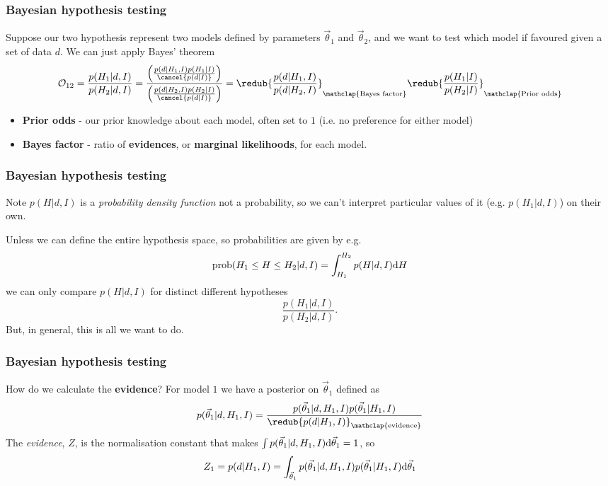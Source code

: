 \begin{frame}

\frametitle{Bayesian hypothesis testing}
\label{bayesianhypothesistesting}

Suppose our two hypothesis represent two models defined by parameters $\vec{\theta}_1$ and
$\vec{\theta}_2$, and we want to test which model if favoured given a set of data $d$. We can
just apply Bayes' theorem
\[
\mathcal{O}_{12} = \frac{p(H_1|d,I)}{p(H_2|d,I)} = \frac{\left( \frac{p(d|H_1,I)p(H_1|I)}{\cancel{p(d|I)}} \right)}
{\left( \frac{p(d|H_2,I)p(H_2|I)}{\cancel{p(d|I)}} \right)} = \redub{\frac{p(d|H_1,I)}{p(d|H_2,I)}}_{\mathclap{\text{Bayes factor}}} \redub{\frac{p(H_1|I)}{p(H_2|I)}}_{\mathclap{\text{Prior odds}}}
\]

\begin{itemize}
\item \textbf{Prior odds} - our prior knowledge about each model, often set to $1$ (i.e. no preference for either model)

\item \textbf{Bayes factor} - ratio of \textbf{evidences}, or \textbf{marginal likelihoods}, for each model.

\end{itemize}

\end{frame}

\begin{frame}

\frametitle{Bayesian hypothesis testing}
\label{bayesianhypothesistesting}

Note $p(H|d,I)$ is a \emph{probability density function} not a probability, so we can't interpret particular values
of it (e.g. $p(H_1|d,I)$) on their own.

Unless we can define the entire hypothesis space, so probabilities are given by e.g.
\[
\text{prob}(H_1 \le H \le H_2|d,I) = \int_{H_1}^{H_2} p(H|d,I) {\rm d}H
\]
we can only compare $p(H|d,I)$ for distinct different hypotheses
\[
\frac{p(H_1|d,I)}{p(H_2|d,I)}.
\]
But, in general, this is all we want to do.

\end{frame}

\begin{frame}

\frametitle{Bayesian hypothesis testing}
\label{bayesianhypothesistesting}

How do we calculate the \textbf{evidence}? For model $1$ we have a posterior on $\vec{\theta}_1$ defined as
\[
p(\vec{\theta}_1|d,H_1,I) = \frac{p(\vec{\theta}_1|d,H_1,I)p(\vec{\theta}_1|H_1,I)}{\redub{p(d|H_1,I)}_{\mathclap{\text{evidence}}}}
\]
The \emph{evidence}, $Z$, is the normalisation constant that makes $\int p(\vec{\theta}_1|d,H_1,I) {\rm d}\vec{\theta}_1 = 1$, so
\[
Z_1 = p(d|H_1,I) = \int_{\vec{\theta}_1}p(\vec{\theta}_1|d,H_1,I)p(\vec{\theta}_1|H_1,I) {\rm d} \vec{\theta}_1
\]

\end{frame}

